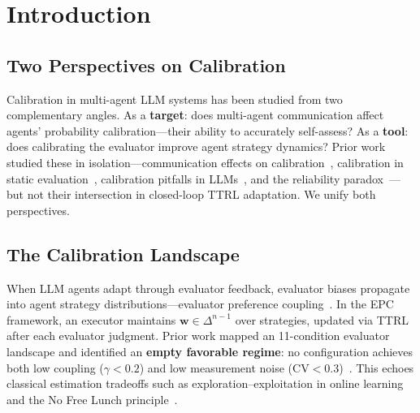 \documentclass[11pt]{article}
\newcommand{\CV}{\ensuremath{\mathrm{CV}}}
\theoremstyle{definition}
\theoremstyle{remark}
\begin{document}
\begin{abstract}
although the sign of every window effect replicates across horizons. We report the delayed-communication hypothesis as unconfirmed rather than established. Calibration shows no effect at any phase or horizon.
\end{abstract}

\newpage

\section{Introduction}

\subsection{Two Perspectives on Calibration}

Calibration in multi-agent LLM systems has been studied from two complementary angles. As a \textbf{target}: does multi-agent communication affect agents' probability calibration---their ability to accurately self-assess? As a \textbf{tool}: does calibrating the evaluator improve agent strategy dynamics? Prior work studied these in isolation---communication effects on calibration~\citep{huang2026cagecal}, calibration in static evaluation~\citep{guo2017calibration}, calibration pitfalls in LLMs~\citep{tian2023calibration}, and the reliability paradox~\citep{messing2026tee}---but not their intersection in closed-loop TTRL adaptation. We unify both perspectives.

\subsection{The Calibration Landscape}

When LLM agents adapt through evaluator feedback, evaluator biases propagate into agent strategy distributions---evaluator preference coupling~\citep{epc2026}. In the EPC framework, an executor maintains $\mathbf{w} \in \Delta^{n-1}$ over strategies, updated via TTRL after each evaluator judgment. Prior work mapped an 11-condition evaluator landscape and identified an \textbf{empty favorable regime}: no configuration achieves both low coupling ($\gamma < 0.2$) and low measurement noise ($\CV < 0.3$)~\citep{caleffects2026}. This echoes classical estimation tradeoffs such as exploration--exploitation in online learning~\citep{bubeck2012regret} and the No Free Lunch principle~\citep{wolpert1997no}.
\end{document}
